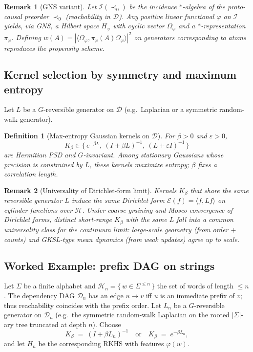\documentclass[12pt,a4paper]{article}
\newtheorem{definition}{Definition}
\newtheorem{remark}{Remark}
\begin{document}
\begin{remark}[GNS variant]
Let $\mathcal{I}(\prec_0)$ be the incidence $*$-algebra of the proto-causal preorder $\prec_0$ (reachability in $\mathcal{D}$). Any positive linear functional $\varphi$ on $\mathcal{I}$ yields, via GNS, a Hilbert space $H_\varphi$ with cyclic vector $\Omega_\varphi$ and a $*$-representation $\pi_\varphi$. Defining $w(A)=|\langle \Omega_\varphi,\pi_\varphi(A)\Omega_\varphi\rangle|^2$ on generators corresponding to atoms reproduces the propensity scheme.
\end{remark}

\subsection{Kernel selection by symmetry and maximum entropy}\label{subsec:kernel_selection}
Let $L$ be a $G$-reversible generator on $\mathcal{D}$ (e.g.\ Laplacian or a symmetric random-walk generator).

\begin{definition}[Max-entropy Gaussian kernels on $\mathcal{D}$]\label{def:maxent_kernel}
For $\beta>0$ and $\varepsilon>0$,
\begin{equation*}
K_\beta \in \big\{\, e^{-\beta L},\ (I+\beta L)^{-1},\ (L+\varepsilon I)^{-1}\,\big\}
\end{equation*}
are Hermitian PSD and $G$-invariant. Among stationary Gaussians whose precision is constrained by $L$, these kernels maximize entropy; $\beta$ fixes a correlation length.
\end{definition}

\begin{remark}[Universality of Dirichlet-form limit]\label{rem:universality_dirichlet}
Kernels $K_\beta$ that share the same reversible generator $L$ induce the same Dirichlet form $\mathcal{E}(f)=\langle f, L f\rangle$ on cylinder functions over $\mathcal{H}$. Under coarse graining and Mosco convergence of Dirichlet forms, distinct short-range $K_\beta$ with the same $L$ fall into a common universality class for the continuum limit: large-scale geometry (from order $+$ counts) and GKSL-type mean dynamics (from weak updates) agree up to scale.
\end{remark}

\subsection{Worked Example: prefix DAG on strings}\label{subsec:worked_prefix}
Let $\Sigma$ be a finite alphabet and $\mathcal{H}_n=\{\,w\in \Sigma^{\le n}\,\}$ the set of words of length $\le n$. The dependency DAG $\mathcal{D}_n$ has an edge $u\to v$ iff $u$ is an immediate prefix of $v$; thus reachability coincides with the prefix order. Let $L_n$ be a $G$-reversible generator on $\mathcal{D}_n$ (e.g.\ the symmetric random-walk Laplacian on the rooted $|\Sigma|$-ary tree truncated at depth $n$). Choose
\begin{equation*}
K_\beta \;=\; (I+\beta L_n)^{-1}\quad\text{or}\quad K_\beta \;=\; e^{-\beta L_n},
\end{equation*}
and let $H_n$ be the corresponding RKHS with features $\varphi(w)$.
\end{document}
